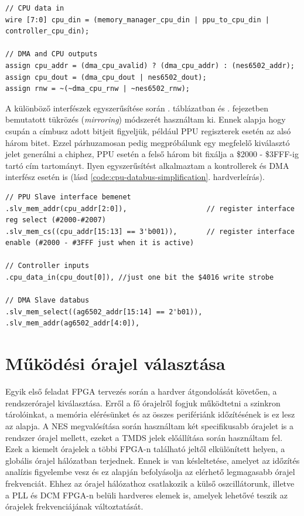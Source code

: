 \begin{lstlisting}[caption={CPU adatbuszt befolyásoló DMA jelek}, label={code:cpu-data-bus}, style=prettyverilog]
// CPU data in
wire [7:0] cpu_din = (memory_manager_cpu_din | ppu_to_cpu_din | controller_cpu_din);

// DMA and CPU outputs
assign cpu_addr = (dma_cpu_avalid) ? (dma_cpu_addr) : (nes6502_addr);
assign cpu_dout = (dma_cpu_dout | nes6502_dout);
assign rnw = ~(~dma_cpu_rnw | ~nes6502_rnw);\end{lstlisting}

A különböző interfészek egyszerűsítése során . táblázatban és . fejezetben bemutatott tükrözés (\textit{mirroring}) módszerét %
használtam ki. Ennek alapja hogy csupán a címbusz adott bitjeit figyeljük, például PPU regiszterek esetén az alsó három bitet. Ezzel párhuzamosan pedig megpróbálunk egy megfelelő kiválasztó jelet generálni a chiphez, PPU esetén a felső három bit fixálja a \$2000 - \$3FFF-ig tartó cím tartományt. Ilyen egyszerűsítést alkalmaztam a kontrollerek és DMA interfész esetén is (lásd \ref{code:cpu-databus-simplification}. hardverleírás).

\begin{lstlisting}[caption={A CPU adatbusz interfészek egyzserüsítése}, label={code:cpu-databus-simplification}, style=prettyverilog]
// PPU Slave interface bemenet
.slv_mem_addr(cpu_addr[2:0]),      				// register interface reg select (#2000-#2007)
.slv_mem_cs((cpu_addr[15:13] == 3'b001)), 		// register interface enable (#2000 - #3FFF just when it is active)

// Controller inputs
.cpu_data_in(cpu_dout[0]), //just one bit the $4016 write strobe

// DMA Slave databus
.slv_mem_select((ag6502_addr[15:14] == 2'b01)),  
.slv_mem_addr(ag6502_addr[4:0]),\end{lstlisting}

\section{Működési órajel választása}

Egyik első feladat FPGA tervezés során a hardver átgondolását követően, a rendszerórajel kiválasztása. Erről a fő órajelről fogjuk működtetni a szinkron tárolóinkat, a memória elérésünket és az összes perifériánk időzítésének is ez lesz az alapja. A NES megvalósítása során használtam két specifikusabb órajelet is a rendszer órajel mellett, ezeket a TMDS jelek előállítása során használtam fel. Ezek a kiemelt órajelek a többi FPGA-n található jeltől elkülönített helyen, a globális órajel hálózatban terjednek. Ennek is van késleltetése, amelyet az időzítés analízis figyelembe vesz és ez alapján befolyásolja az elérhető legmagasabb órajel frekvenciát. Ehhez az órajel hálózathoz csatlakozik a külső oszcillátorunk, %
 illetve a PLL és DCM FPGA-n belüli hardveres elemek is, amelyek lehetővé teszik az órajelek frekvenciájának változtatását.

